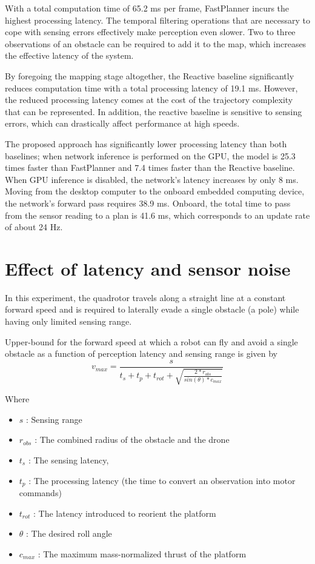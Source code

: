 With a total computation time of 65.2 ms per frame, FastPlanner \cite{fastPlanner} incurs the highest processing latency. The
temporal filtering operations that are necessary to cope with sensing errors effectively make perception even slower. Two to three observations
of an obstacle can be required to add it to the map, which increases
the effective latency of the system. 

By foregoing the mapping stage
altogether, the Reactive \cite{reactive_method} baseline significantly reduces computation
time with a total processing latency of 19.1 ms. However, the reduced processing
latency comes at the cost of the trajectory complexity that can be represented. In addition, the reactive\cite{reactive_method} baseline is sensitive to sensing errors,
which can drastically affect performance at high speeds.
 

The proposed approach has significantly lower processing latency than both
baselines; when network inference is performed on the GPU, the model is 25.3 times faster than FastPlanner\cite{fastPlanner} and 7.4 times faster
than the Reactive baseline. When GPU inference is disabled, the
network’s latency increases by only 8 ms. Moving from the desktop computer
to the onboard embedded computing device, the network’s forward
pass requires 38.9 ms. Onboard, the total time to pass from the sensor
reading to a plan is 41.6 ms, which corresponds to an update rate of about 24 Hz.



\section{Effect of latency and sensor noise}
In this experiment, the quadrotor travels along a
straight line at a constant forward speed and is required to laterally
evade a single obstacle (a pole) while having only limited sensing
range. 

Upper-bound for the forward speed at which a robot can
fly and avoid a single obstacle as a function of perception latency and
sensing range is given by
\begin{equation}
	v_{max} = \frac{s}{t_s + t_p + t_{rot} + \sqrt{\frac{2*r_{obs}}{sin(\theta)*c_{max}}}}
\end{equation}

Where
\begin{itemize}
	\item $s$ : Sensing range
	\item $r_{obs}$ : The combined radius of the obstacle and the drone
	\item $t_s$ : The sensing latency,
	\item $t_p$ : The processing
latency (the time to convert an observation into motor commands)
	\item $t_{rot}$ : The latency introduced to reorient the platform
	\item $\theta$ : The desired roll angle
	\item $c_{max}$ : The maximum mass-normalized thrust of the platform
\end{itemize}

